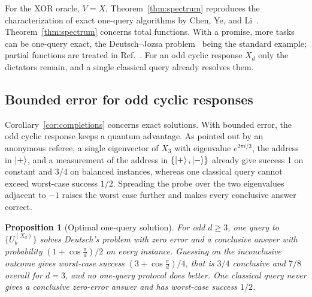\documentclass[
  aps,
  pra,
  reprint,
  nofootinbib
]{revtex4-2}
\newtheorem{proposition}{Proposition}
\begin{document}
For the XOR oracle, \(V=X\), Theorem~\ref{thm:spectrum} reproduces the
characterization of exact one-query algorithms by Chen, Ye, and
Li~\cite{ChenYeLi2020}. Theorem~\ref{thm:spectrum} concerns total
functions. With a promise, more tasks can be one-query exact, the
Deutsch--Jozsa problem~\cite{deutsch:92} being the standard example; partial
functions are treated in Ref.~\cite{YeLi2020partial}. For an odd cyclic
response \(X_d\) only the dictators remain, and a single classical query
already resolves them.

\subsection{Bounded error for odd cyclic responses}

Corollary~\ref{cor:completions} concerns exact solutions. With bounded error,
the odd cyclic response keeps a quantum advantage. As pointed out by an
anonymous referee, a single eigenvector of \(X_3\) with eigenvalue
\(e^{2\pi i/3}\), the address in \(\ket+\), and a measurement of the address in \(\{\ket+,\ket-\}\) already give success 1 on
constant and \(3/4\) on balanced instances, whereas one classical query cannot
exceed worst-case success \(1/2\). Spreading the probe over the two
eigenvalues adjacent to \(-1\) raises the worst case further and makes every
conclusive answer correct.

\begin{proposition}[Optimal one-query solution]\label{prop:bounded}
For odd \(d\ge3\), one query to \(\{U_b^{(X_d)}\}\) solves Deutsch's problem
with zero error and a conclusive answer with probability
\((1+\cos\frac{\pi}{d})/2\) on every instance. Guessing on the inconclusive
outcome gives worst-case success \((3+\cos\frac{\pi}{d})/4\), that is \(3/4\)
conclusive and \(7/8\) overall for \(d=3\), and no one-query protocol does
better. One classical query never gives a conclusive zero-error answer and has
worst-case success \(1/2\).
\end{proposition}
\end{document}
